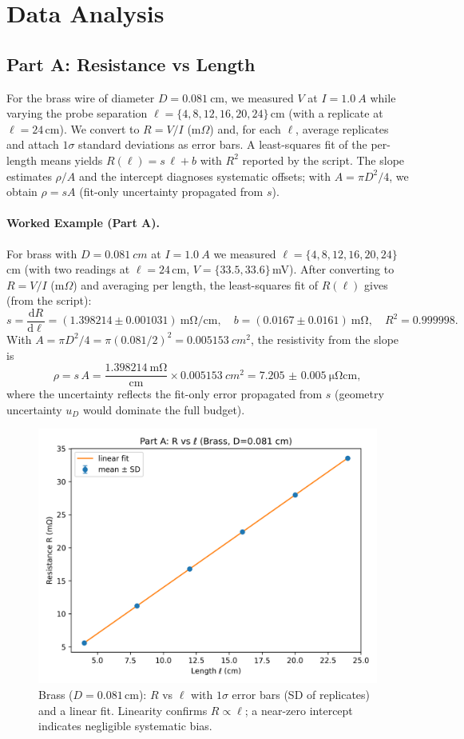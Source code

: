 \documentclass[12pt]{article}
\numberwithin{equation}{section}
\begin{document}
\section{Data Analysis}

\subsection{Part A: Resistance vs Length}
For the brass wire of diameter $D=\SI{0.081}{\centi\metre}$, we measured $V$ at $I=\SI{1.0}{A}$ while varying the probe separation $\ell=\{4,8,12,16,20,24\}\,$cm (with a replicate at $\ell=24$\,cm). We convert to $R=V/I$ (m$\Omega$) and, for each $\ell$, average replicates and attach $1\sigma$ standard deviations as error bars. A least-squares fit of the per-length means yields $R(\ell)=s\,\ell+b$ with $R^2$ reported by the script. The slope estimates $\rho/A$ and the intercept diagnoses systematic offsets; with $A=\pi D^2/4$, we obtain $\rho=sA$ (fit-only uncertainty propagated from $s$).
\paragraph*{Worked Example (Part A).}
For brass with $D=\SI{0.081}{cm}$ at $I=\SI{1.0}{A}$ we measured
$\ell=\{4,8,12,16,20,24\}$\,cm (with two readings at $\ell=24$\,cm, $V=\{33.5,33.6\}$\,mV).
After converting to $R=V/I$ (m$\Omega$) and averaging per length, the least-squares fit of
$R(\ell)$ gives (from the script):
\[
s=\frac{\mathrm{d}R}{\mathrm{d}\ell}=(\num{1.398214}\pm\num{0.001031})~\mathrm{m\Omega/cm},\quad
b=(\num{0.0167}\pm\num{0.0161})~\mathrm{m\Omega},\quad R^2=\num{0.999998}.
\]
With $A=\pi D^2/4=\pi(0.081/2)^2=\SI{0.005153}{cm^2}$, the resistivity from the slope is
\[
\rho = s\,A
= \frac{\num{1.398214}\ \mathrm{m\Omega}}{\mathrm{cm}}\times \SI{0.005153}{cm^2}
= \boxed{\SI{7.205(5)}{\micro\ohm\centi\metre}},
\]
where the uncertainty reflects the fit-only error propagated from $s$ (geometry uncertainty $u_D$ would dominate the full budget).

\begin{figure}[h]
  \centering
  \includegraphics[width=0.72\linewidth]{figs/PartA_R_vs_L.png}
  \caption{Brass ($D=0.081$\,cm): $R$ vs $\ell$ with $1\sigma$ error bars (SD of replicates) and a linear fit. Linearity confirms $R\propto \ell$; a near-zero intercept indicates negligible systematic bias.}
  \label{fig:partA}
\end{figure}
\FloatBarrier
\end{document}
